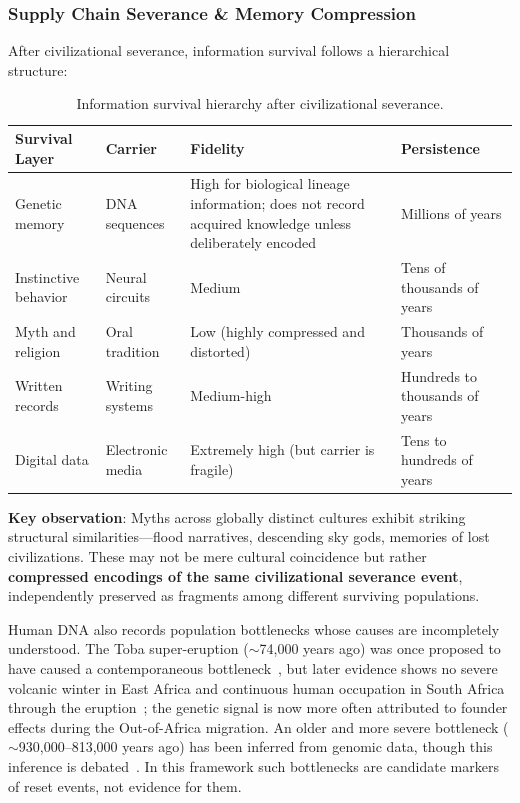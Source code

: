 \documentclass[aps,prd,twocolumn,superscriptaddress,nofootinbib]{revtex4-2}
\begin{document}
\subsubsection{Supply Chain Severance \& Memory Compression}\label{sec:memory-compression}

After civilizational severance, information survival follows a hierarchical structure:

\begin{table}[htbp]
\caption{Information survival hierarchy after civilizational severance.}
\label{tab:memory}
\footnotesize
\begin{tabular}{P{0.190\textwidth}P{0.177\textwidth}P{0.282\textwidth}P{0.223\textwidth}}
\toprule
Survival Layer & Carrier & Fidelity & Persistence \\
\midrule
Genetic memory & DNA sequences & High for biological lineage information; does not record acquired knowledge unless deliberately encoded & Millions of years \\
Instinctive behavior & Neural circuits & Medium & Tens of thousands of years \\
Myth and religion & Oral tradition & Low (highly compressed and distorted) & Thousands of years \\
Written records & Writing systems & Medium-high & Hundreds to thousands of years \\
Digital data & Electronic media & Extremely high (but carrier is fragile) & Tens to hundreds of years \\
\bottomrule
\end{tabular}
\end{table}

\textbf{Key observation}: Myths across globally distinct cultures exhibit striking structural similarities---flood narratives, descending sky gods, memories of lost civilizations. These may not be mere cultural coincidence but rather \textbf{compressed encodings of the same civilizational severance event}, independently preserved as fragments among different surviving populations.

Human DNA also records population bottlenecks whose causes are incompletely understood. The Toba super-eruption (${\sim}$74,000 years ago) was once proposed to have caused a contemporaneous bottleneck~\cite{Ambrose1998}, but later evidence shows no severe volcanic winter in East Africa and continuous human occupation in South Africa through the eruption~\cite{Lane2013,Smith2018}; the genetic signal is now more often attributed to founder effects during the Out-of-Africa migration. An older and more severe bottleneck (${\sim}$930,000--813,000 years ago) has been inferred from genomic data, though this inference is debated~\cite{Hu2023}. In this framework such bottlenecks are candidate markers of reset events, not evidence for them.
\end{document}
